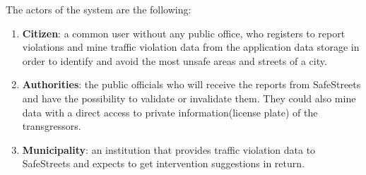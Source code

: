 The actors of the system are the following:
\begin{enumerate}
	\item \textbf{Citizen}: a common user without any public office, who registers to report violations and mine traffic violation data from the application data storage in order to identify and avoid the most unsafe areas and streets of a city.
	\item\textbf{Authorities}: the public officials who will receive the reports from SafeStreets and have the possibility to validate or invalidate them. They could also mine data with a direct access to private information(license plate) of the transgressors.
	\item \textbf{Municipality}: an institution that provides traffic violation data to SafeStreets and expects to get intervention suggestions in return.
\end{enumerate}